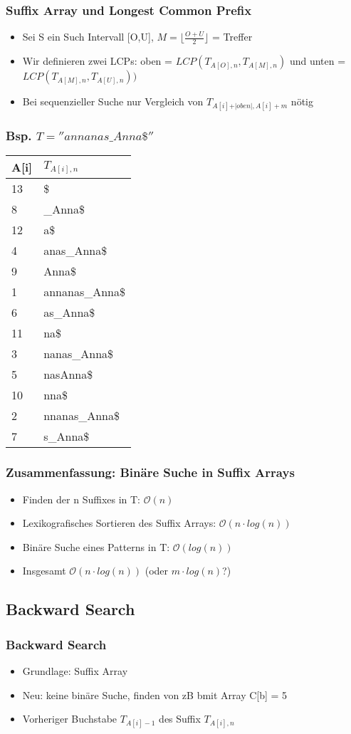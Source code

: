\documentclass{beamer}
\begin{document}
\begin{frame}
\frametitle{Suffix Array und Longest Common Prefix}
\begin{itemize}
\item Sei S ein Such Intervall [O,U], $M = \lfloor \frac{O+U}{2}\rfloor$ = Treffer
\item Wir definieren zwei LCPs: oben = $LCP(T_{A[O],n},T_{A[M],n})$ und unten = $LCP(T_{A[M],n},T_{A[U],n}))$
\item Bei sequenzieller Suche nur Vergleich von $T_{A[i]+\vert oben\vert, A[i]+m}$ nötig
\end{itemize}
\end{frame}

\begin{frame}
\frametitle{Bsp. $T = ''annanas\_Anna\$''$}
\begin{tabular}{l|l<{\ttfamily}}
\textbf{A[i]} & $T_{A[i],n}$\\\hline
13 & \$\\
8 & \_Anna\$\\
12 & a\$\\
4 & anas\_Anna\$\\
9 & Anna\$\\
1 & annanas\_Anna\$\\
6 & as\_Anna\$\\  %
11 & na\$\\
3 & nanas\_Anna\$\\
5 & nasAnna\$\\
10 & nna\$\\
2 & nnanas\_Anna\$\\
7 & s\_Anna\$\\
\end{tabular}
\end{frame}

\begin{frame}
\frametitle{Zusammenfassung: Binäre Suche in Suffix Arrays}
\begin{itemize}
\item Finden der n Suffixes in T: $\mathcal{O}(n)$
\item Lexikografisches Sortieren des Suffix Arrays: $\mathcal{O}(n\cdot log (n))$
\item Binäre Suche eines Patterns in T: $\mathcal{O}(log (n))$
\item Insgesamt $\mathcal{O}(n \cdot log (n))$ (oder $m \cdot log (n)$?)
\end{itemize}
\end{frame}
\subsection{Backward Search}
\begin{frame}
\frametitle{Backward Search}
\begin{itemize}
\item Grundlage: Suffix Array
\item Neu: keine binäre Suche, finden von zB \glqq b\grqq mit Array C[\glqq b\grqq ] = 5
\item Vorheriger Buchstabe $T_{A[i]-1}$ des Suffix $T_{A[i],n}$
\end{itemize}
\end{frame}
\end{document}
